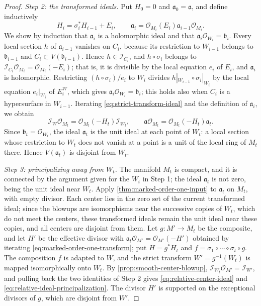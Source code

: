 \begin{proof}
\emph{Step 2: the transformed ideals.} Put $H_0=0$ and $\mathfrak a_0=\mathfrak a$, and define inductively
\[
 H_i=\sigma_i^*H_{i-1}+E_i,\qquad
 \mathfrak a_i=\mathcal O_{M_i}(E_i)
                         \mathfrak a_{i-1}\mathcal O_{M_i}.
\]
We show by induction that $\mathfrak a_i$ is a holomorphic ideal and that $\mathfrak a_i\mathcal O_{W_i}=\mathfrak b_i$. Every local section $h$ of $\mathfrak a_{i-1}$ vanishes on $C_i$, because its restriction to $W_{i-1}$ belongs to $\mathfrak b_{i-1}$ and $C_i\subset V(\mathfrak b_{i-1})$. Hence $h\in\mathcal I_{C_i}$, and $h\circ\sigma_i$ belongs to $\mathcal I_{C_i}\mathcal O_{M_i}=\mathcal O_{M_i}(-E_i)$; that is, it is divisible by the local equation $e_i$ of $E_i$, and $\mathfrak a_i$ is holomorphic. Restricting $(h\circ\sigma_i)/e_i$ to $W_i$ divides $h|_{W_{i-1}}\circ\sigma_i|_{W_i}$ by the local equation $e_i|_{W_i}$ of $E^W_i$, which gives $\mathfrak a_i\mathcal O_{W_i}=\mathfrak b_i$; this holds also when $C_i$ is a hypersurface in $W_{i-1}$. Iterating \eqref{eq:strict-transform-ideal} and the definition of $\mathfrak a_i$, we obtain
\[
 \mathcal I_W\mathcal O_{M_t}=\mathcal O_{M_t}(-H_t)\mathcal I_{W_t},
 \qquad
 \mathfrak a\mathcal O_{M_t}=\mathcal O_{M_t}(-H_t)\mathfrak a_t.
\]
Since $\mathfrak b_t=\mathcal O_{W_t}$, the ideal $\mathfrak a_t$ is the unit ideal at each point of $W_t$: a local section whose restriction to $W_t$ does not vanish at a point is a unit of the local ring of $M_t$ there. Hence $V(\mathfrak a_t)$ is disjoint from $W_t$.

\emph{Step 3: principalizing away from $W_t$.} The manifold $M_t$ is compact, and it is connected by the argument given for the $W_i$ in Step 1; the ideal $\mathfrak a_t$ is not zero, being the unit ideal near $W_t$. Apply \cref{thm:marked-order-one-input} to $\mathfrak a_t$ on $M_t$, with empty divisor. Each center lies in the zero set of the current transformed ideal; since the blowups are isomorphisms near the successive copies of $W_t$, which do not meet the centers, these transformed ideals remain the unit ideal near these copies, and all centers are disjoint from them. Let $g\colon M'\to M_t$ be the composite, and let $H'$ be the effective divisor with $\mathfrak a_t\mathcal O_{M'}=\mathcal O_{M'}(-H')$ obtained by iterating \eqref{eq:marked-order-one-transform}; put $H=g^*H_t$ and $f=\sigma_1\circ\cdots\circ\sigma_t\circ g$. The composition $f$ is adapted to $W$, and the strict transform $W'=g^{-1}(W_t)$ is mapped isomorphically onto $W_t$. By \cref{prop:smooth-center-blowup}, $\mathcal I_{W_t}\mathcal O_{M'}=\mathcal I_{W'}$, and pulling back the two identities of Step 2 gives \eqref{eq:relative-center-ideal} and \eqref{eq:relative-ideal-principalization}. The divisor $H'$ is supported on the exceptional divisors of $g$, which are disjoint from $W'$.


\end{proof}
